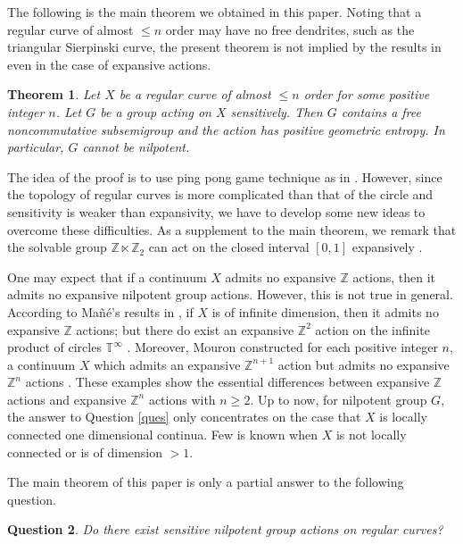 \documentclass[12pt,a4paper]{amsart}
\newtheorem{thm}{Theorem}[section]
\newtheorem{ques}[thm]{Question}
\theoremstyle{definition}
\numberwithin{equation}{section}
\begin{document}
The following is the main theorem we obtained  in this paper. Noting that a regular curve of almost $\leq n$ order may have no free dendrites, such as the
triangular Sierpinski curve, the present theorem is not implied by the results in \cite{SW} even in the case of expansive actions.

\begin{thm}\label{Main Theorem}
Let $X$ be a regular curve of almost $\leq n$ order for some positive integer $n$. Let $G$ be a group
acting on $X$ sensitively. Then $G$ contains a free noncommutative subsemigroup and the action has
positive geometric entropy. In particular, $G$ cannot be nilpotent.
\end{thm}

The idea of the proof is to use ping pong game technique as in \cite{CFH}. However, since the topology of
regular curves is more complicated than that of the circle and sensitivity is weaker than expansivity,
we have to develop some new ideas to overcome these difficulties.
As a supplement to the main theorem, we remark that the solvable group  $\mathbb Z\ltimes \mathbb Z_2$ can act on the closed
interval $[0, 1]$ expansively \cite{SZ}.



One may expect that if a continuum $X$ admits no expansive $\mathbb Z$ actions, then it admits no expansive nilpotent
group actions. However, this is not true in general. According to Ma\~{n}\'{e}'s results in \cite{Ma}, if $X$ is of
infinite dimension, then it admits no expansive $\mathbb Z$ actions; but there do exist an expansive $\mathbb Z^2$ action
on the infinite product of circles $\mathbb T^\infty$ \cite{SZ}. Moreover,  Mouron constructed for each positive integer $n$,
a continuum $X$ which admits an expansive $\mathbb Z^{n+1}$ action but admits no expansive $\mathbb Z^n$ actions \cite{Mo10}. These examples
show the essential differences between expansive $\mathbb Z$ actions and expansive $\mathbb Z^n$ actions with $n\geq 2$.
Up to now, for nilpotent group $G$, the answer to Question \ref{ques} only concentrates on the case that $X$ is locally connected one dimensional continua.
Few is known when $X$ is not locally connected or is of dimension $>1$.


The main theorem of this paper is only a partial answer to the following question.

\begin{ques}\label{question2}
Do there exist  sensitive nilpotent group actions on regular curves?
\end{ques}
\end{document}
